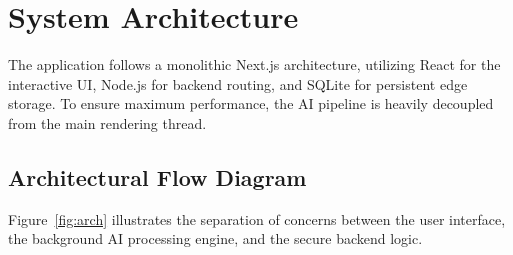\documentclass[12pt,a4paper]{report}
\begin{document}
\chapter{System Architecture}
\onehalfspacing
The application follows a monolithic Next.js architecture, utilizing React for the interactive UI, Node.js for backend routing, and SQLite for persistent edge storage. To ensure maximum performance, the AI pipeline is heavily decoupled from the main rendering thread.

\section{Architectural Flow Diagram}
Figure~\ref{fig:arch} illustrates the separation of concerns between the user interface, the background AI processing engine, and the secure backend logic.
\end{document}

